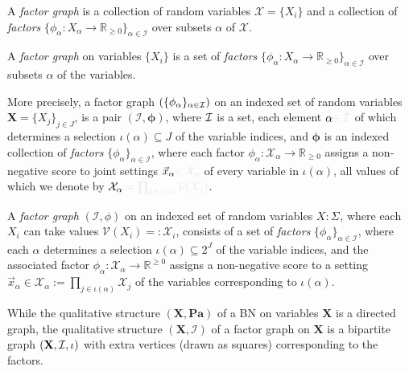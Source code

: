 \documentclass{article}
\newcommand{\notation}[2][]{#1}
\renewcommand{\notation}[2][]{{\color{notationcolor} #2}}
\newcommand{\V}{\mathcal V}
\newcommand{\N}{\mathcal N}
\newcommand{\Ed}{\mathcal E}
\numberwithin{equation}{section}
\begin{document}
	
\begin{quickdefn}
	A \emph{factor graph} is a collection of random variables $\mathcal X = \{X_i\}$ and a collection of \emph{factors} $\{\phi_\alpha\colon X_\alpha \to \mathbb R_{\geq0}\}_{\alpha \in \mathcal I }$ over subsets $\alpha$ of $\mathcal X$.
\end{quickdefn}
	\begin{defn}
		A \emph{factor graph} on variables $\{X_i\}$ is a set of \emph{factors} $\{\phi_\alpha\colon X_\alpha \to \mathbb R_{\geq0}\}_{\alpha \in \mathcal I }$ over subsets $\alpha$ of the variables.
		
		More precisely, a factor graph $ (\{\phi_\alpha\}_{\alpha \in \cal I})$ on an indexed set of random variables $\mathbf X = \{ X_j \}_{j \in J}$, 
		is a pair $(\mathcal I, \boldsymbol\phi)$, where $\cal I$ is a set,
		each element $\alpha\notation{\in \mathcal I}$ of which determines a selection $\iota(\alpha) \subseteq J$ of the variable indices, and
		$\boldsymbol\phi$ is an indexed collection of \emph{factors} $\{\phi_\alpha\}_{\alpha \in \mathcal I }$, 
		where each factor $\phi_\alpha \colon \mathcal X_\alpha \to \mathbb R_{\geq 0}$ assigns a non-negative score to joint settings $\vec x_\alpha \notation{\in \mathcal X_\alpha}$ of every variable in $\iota(\alpha)$, all values of which we denote by $\mathcal X_\alpha\notation{ := \prod_{j \in \iota(\alpha)} \mathcal V(X_j)}$. 
	\end{defn}
\begin{fulldefn}
	A \emph{factor graph} $(\mathcal I, \phi)$ on an indexed set of random variables $X : \Sigma_{}$, where each $X_i$ can take values $\V(X_i) =: \mathcal X_i$, consists of  
	a set of \emph{factors} $\{\phi_\alpha\}_{\alpha \in \mathcal I }$, where each $\alpha$ determines a selection $\iota(\alpha) \subseteq 2^J$ of the variable indices, and the associated factor $\phi_\alpha \colon \mathcal X_\alpha \to \mathbb R^{\geq 0}$ assigns a non-negative score to a setting $\vec x_\alpha \in \mathcal X_\alpha := \prod_{j \in \iota(\alpha)} \mathcal X_j$ of the variables corresponding to $\iota(\alpha)$.
	
\end{fulldefn}

	While the qualitative structure $(\mathbf X, \mathbf{Pa})$ of a BN on variables $\mathbf X$ is a directed graph, the qualitative structure $(\mathbf X, \mathcal I)$ of a factor graph on $\mathbf X$ is
	a bipartite graph $({\mathbf X, \cal I}, \iota)$ with extra vertices (drawn as squares) corresponding to the factors. 
	
\end{document}
